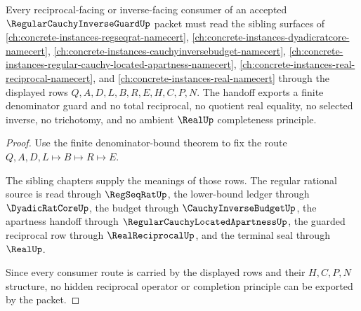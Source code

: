 \begin{theorem}
\label{thm:regular-cauchy-inverse-guard-reciprocal-read-boundary}
Every reciprocal-facing or inverse-facing consumer of an accepted $\RegularCauchyInverseGuardUp$ packet must read the sibling surfaces of \autoref{ch:concrete-instances-regseqrat-namecert}, \autoref{ch:concrete-instances-dyadicratcore-namecert}, \autoref{ch:concrete-instances-cauchyinversebudget-namecert}, \autoref{ch:concrete-instances-regular-cauchy-located-apartness-namecert}, \autoref{ch:concrete-instances-real-reciprocal-namecert}, and \autoref{ch:concrete-instances-real-namecert} through the displayed rows $Q,A,D,L,B,R,E,H,C,P,N$. The handoff exports a finite denominator guard and no total reciprocal, no quotient real equality, no selected inverse, no trichotomy, and no ambient $\RealUp$ completeness principle.
\end{theorem}
\begin{proof}
Use the finite denominator-bound theorem to fix the route $Q,A,D,L \longmapsto B \longmapsto R \longmapsto E$.

The sibling chapters supply the meanings of those rows. The regular rational source is read through $\RegSeqRatUp$, the lower-bound ledger through $\DyadicRatCoreUp$, the budget through $\CauchyInverseBudgetUp$, the apartness handoff through $\RegularCauchyLocatedApartnessUp$, the guarded reciprocal row through $\RealReciprocalUp$, and the terminal seal through $\RealUp$.

Since every consumer route is carried by the displayed rows and their $H,C,P,N$ structure, no hidden reciprocal operator or completion principle can be exported by the packet.
\end{proof}



